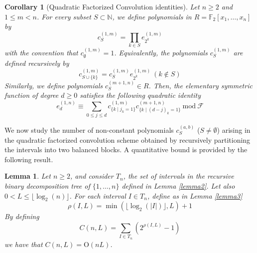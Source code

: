 \documentclass{amsart}
\newtheorem{lemma}[theorem]{Lemma}
\newtheorem{corollary}[theorem]{Corollary}
\def\NN{{\mathbb N}}
\def\FF{{\mathbb F}}
\def\mod{{\mathrm{mod}}}
\def\cF{{\mathcal{F}}}
\def\cO{{\mathrm{O}}}
\begin{document}
\begin{corollary}[Quadratic Factorized Convolution identities]
Let $n\geq 2$ and $1\leq m < n$. For every subset $S\subset\NN$, we define
polynomials in $R = \FF_2[x_1,\ldots,x_n]$ by
\[
c^{(1,m)}_S = \prod_{k\in S} e_{2^k}^{(1,m)}
\]
with the convention that $c^{(1,m)}_\emptyset = 1$. Equivalently, the polynomials
$c^{(1,m)}_S$ are defined recursively by
\[
c^{(1,m)}_{S\cup\{k\}} = c^{(1,m)}_S e_{2^k}^{(1,m)}\ (k\notin S)
\]
Similarly, we define polynomials $c^{(m+1,n)}_S\in R$. Then,
the elementary symmetric function of degree $d\geq 0$ satisfies
the following quadratic identity
\[
e_{d}^{(1,n)} \equiv \sum_{0\leq j\leq d} c^{(1,m)}_{\{k\mid j_k = 1\}}
c^{(m+1,n)}_{\{k\mid (d-j)_k = 1\}}
\ \mod\ \cF
\]
\end{corollary}

We now study the number of non-constant polynomials $c_S^{(a,b)}$ ($S\neq\emptyset$)
arising in the quadratic factorized convolution scheme obtained by recursively
partitioning the intervals into two balanced blocks. A quantitative bound is provided
by the following result.

\begin{lemma}
\label{lemma4}
Let $n\geq 2$, and consider $T_n$, the set of intervals in the recursive binary
decomposition tree of $\{1,\ldots,n\}$ defined in Lemma \ref{lemma2}.
Let also $0 < L\leq \lfloor \log_2(n) \rfloor$. For each interval $I\in T_n$, define
as in Lemma \ref{lemma3}
\[
\rho(I,L) = \min(\lfloor \log_2(|I|)\rfloor, L) + 1
\]
By defining
\[
C(n,L) = \sum_{I\in T_n} (2^{\rho(I,L)} - 1)
\]
we have that $C(n,L) = \cO( n L )$.
\end{lemma}
\end{document}
